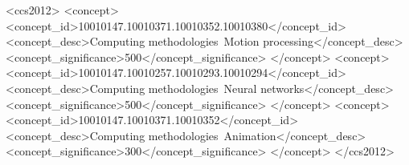 \documentclass[sigconf, screen, review, anonymous]{acmart}
\begin{document}










\begin{CCSXML}
<ccs2012>
   <concept>
       <concept_id>10010147.10010371.10010352.10010380</concept_id>
       <concept_desc>Computing methodologies~Motion processing</concept_desc>
       <concept_significance>500</concept_significance>
       </concept>
   <concept>
       <concept_id>10010147.10010257.10010293.10010294</concept_id>
       <concept_desc>Computing methodologies~Neural networks</concept_desc>
       <concept_significance>500</concept_significance>
       </concept>
   <concept>
       <concept_id>10010147.10010371.10010352</concept_id>
       <concept_desc>Computing methodologies~Animation</concept_desc>
       <concept_significance>300</concept_significance>
       </concept>
 </ccs2012>
\end{CCSXML}



\end{document}
